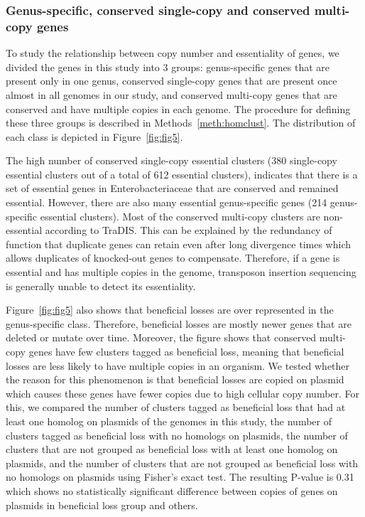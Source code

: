 \documentclass[12pt,letterpaper]{article}
\begin{document}
\subsubsection{Genus-specific, conserved single-copy and conserved multi-copy genes}
To study the relationship between copy number and essentiality of genes, we divided the genes in this study into 3 groups: genus-specific genes that are present only in one genus, conserved single-copy genes that are present once almost in all genomes in our study, and conserved multi-copy genes that are conserved and have multiple copies in each genome. The procedure for defining these three groups is described in Methods~\ref{meth:homclust}. The distribution of each class is depicted in Figure~\ref{fig:fig5}.

The high number of conserved single-copy essential clusters (380 single-copy essential clusters out of a total of 612 essential clusters), indicates that there is a set of essential genes in Enterobacteriaceae that are conserved and remained essential. However, there are also many essential genus-specific genes (214 genus-specific essential clusters). Most of the conserved multi-copy clusters are non-essential according to TraDIS. This can be explained by the redundancy of function that duplicate genes can retain even after long divergence times \cite{dean_pervasive_2008} which allows duplicates of knocked-out genes to compensate. Therefore, if a gene is essential and has multiple copies in the genome, transposon insertion sequencing is generally unable to detect its essentiality.

Figure~\ref{fig:fig5} also shows that beneficial losses are over represented in the genus-specific class. Therefore, beneficial losses are mostly newer genes that are deleted or mutate over time. Moreover, the figure shows that conserved multi-copy genes have few clusters tagged as beneficial loss, meaning that beneficial losses are less likely to have multiple copies in an organism. We tested whether the reason for this phenomenon is that beneficial losses are copied on plasmid which causes these genes have fewer copies due to high cellular copy number. For this, we compared the number of clusters tagged as beneficial loss that had at least one homolog on plasmids of the genomes in this study, the number of clusters tagged as beneficial loss with no homologs on plasmids, the number of clusters that are not grouped as beneficial loss with at least one homolog on plasmids, and the number of clusters that are not grouped as beneficial loss with no homologs on plasmids using Fisher's exact test. The resulting P-value is 0.31 which shows no statistically significant difference between copies of genes on plasmids in beneficial loss group and others.
\end{document}
